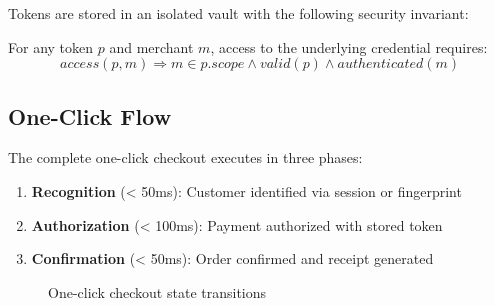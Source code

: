 Tokens are stored in an isolated vault with the following security invariant:

\begin{theorem}
For any token $p$ and merchant $m$, access to the underlying credential requires:
\[
access(p, m) \Rightarrow m \in p.scope \land valid(p) \land authenticated(m)
\]
\end{theorem}

\subsection{One-Click Flow}

The complete one-click checkout executes in three phases:

\begin{enumerate}
    \item \textbf{Recognition} (< 50ms): Customer identified via session or fingerprint
    \item \textbf{Authorization} (< 100ms): Payment authorized with stored token
    \item \textbf{Confirmation} (< 50ms): Order confirmed and receipt generated
\end{enumerate}

\begin{figure}[h]
\centering
{}
\caption{One-click checkout state transitions}
\end{figure}

